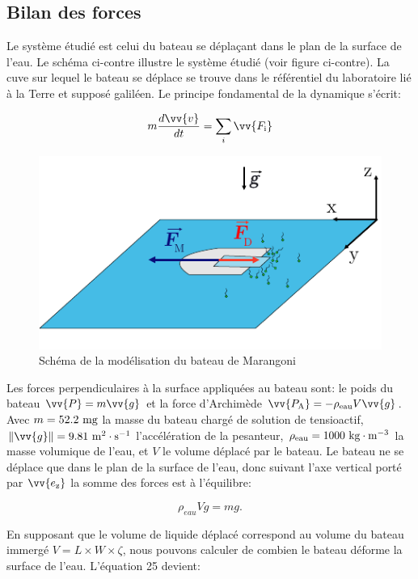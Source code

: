\documentclass[french, 10pt]{article}
\begin{document}
\subsection{Bilan des forces}
Le système étudié est celui du bateau se déplaçant dans le plan de la surface de l'eau. Le schéma ci-contre illustre le système étudié (voir figure ci-contre). La cuve sur lequel le bateau se déplace se trouve dans le référentiel du laboratoire lié à la Terre et supposé galiléen. Le principe fondamental de la dynamique s'écrit:

\begin{equation}
  m\frac{d\vv{v}}{dt} = \sum_i{\vv{F_{\rm i}}}
  \label{eqn:Newton}
\end{equation}

\begin{figure}[ht]
  \centering
  \includegraphics[width=.5\textwidth]{SchemaModeleBateau.pdf}
  \caption{Schéma de la modélisation du bateau de Marangoni}
  \label{fig:ModelSketchBateauMarangoni}
\end{figure}


Les forces perpendiculaires à la surface appliquées au bateau sont: le poids du bateau $\vv{P}=m\vv{g}$ et la force d'Archimède $\vv{P_{\rm A}} = -\rho_{\rm eau} V \vv{g}$. Avec $m=52.2~\rm mg$ la masse du bateau chargé de solution de tensioactif, $\|\vv{g}\| = 9.81~\rm m^2\cdot s^{-1}$ l'accélération de la pesanteur, $\rho_{\rm eau}=1000~\rm kg\cdot m^{-3}$ la masse volumique de l'eau, et $V$ le volume déplacé par le bateau. Le bateau ne se déplace que dans le plan de la surface de l'eau, donc suivant l'axe vertical porté par $\vv{e_{\rm z}}$ la somme des forces est à l'équilibre: 

\begin{equation}
  \rho_{eau} V g = mg \label{eq:SommeDesForcesVerticales}.
\end{equation}

En supposant que le volume de liquide déplacé correspond au volume du bateau immergé $V=L\times W \times \zeta$, nous pouvons calculer de combien le bateau déforme la surface de l'eau. L'équation 25 devient:
\end{document}
